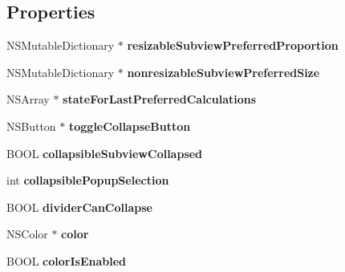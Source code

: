 \subsection*{\-Properties}
\begin{DoxyCompactItemize}
\item 
\hypertarget{interface_b_w_split_view_a67f2a1079982564751ac01bfcce5ebdd}{
\-N\-S\-Mutable\-Dictionary $\ast$ {\bfseries resizable\-Subview\-Preferred\-Proportion}}
\label{interface_b_w_split_view_a67f2a1079982564751ac01bfcce5ebdd}

\item 
\hypertarget{interface_b_w_split_view_a39bf8385388d1365d19473da728ea8c6}{
\-N\-S\-Mutable\-Dictionary $\ast$ {\bfseries nonresizable\-Subview\-Preferred\-Size}}
\label{interface_b_w_split_view_a39bf8385388d1365d19473da728ea8c6}

\item 
\hypertarget{interface_b_w_split_view_a660192c91d04b014174369f7903ee940}{
\-N\-S\-Array $\ast$ {\bfseries state\-For\-Last\-Preferred\-Calculations}}
\label{interface_b_w_split_view_a660192c91d04b014174369f7903ee940}

\item 
\hypertarget{interface_b_w_split_view_a48f765380da4aa8b0ff6838b008ba043}{
\-N\-S\-Button $\ast$ {\bfseries toggle\-Collapse\-Button}}
\label{interface_b_w_split_view_a48f765380da4aa8b0ff6838b008ba043}

\item 
\hypertarget{interface_b_w_split_view_aa59399880253211fb7b5ddee19cbb10c}{
\-B\-O\-O\-L {\bfseries collapsible\-Subview\-Collapsed}}
\label{interface_b_w_split_view_aa59399880253211fb7b5ddee19cbb10c}

\item 
\hypertarget{interface_b_w_split_view_ab03021a6951dbea7fc2f1b6987e714f9}{
int {\bfseries collapsible\-Popup\-Selection}}
\label{interface_b_w_split_view_ab03021a6951dbea7fc2f1b6987e714f9}

\item 
\hypertarget{interface_b_w_split_view_aff785a7ec92bd692e98a9ca46d01491c}{
\-B\-O\-O\-L {\bfseries divider\-Can\-Collapse}}
\label{interface_b_w_split_view_aff785a7ec92bd692e98a9ca46d01491c}

\item 
\hypertarget{interface_b_w_split_view_a9a7be58a01a88676f80441873dedecc2}{
\-N\-S\-Color $\ast$ {\bfseries color}}
\label{interface_b_w_split_view_a9a7be58a01a88676f80441873dedecc2}

\item 
\hypertarget{interface_b_w_split_view_a2fbef3fc9ca4d183997ce5efc79974b3}{
\-B\-O\-O\-L {\bfseries color\-Is\-Enabled}}
\label{interface_b_w_split_view_a2fbef3fc9ca4d183997ce5efc79974b3}

\end{DoxyCompactItemize}


